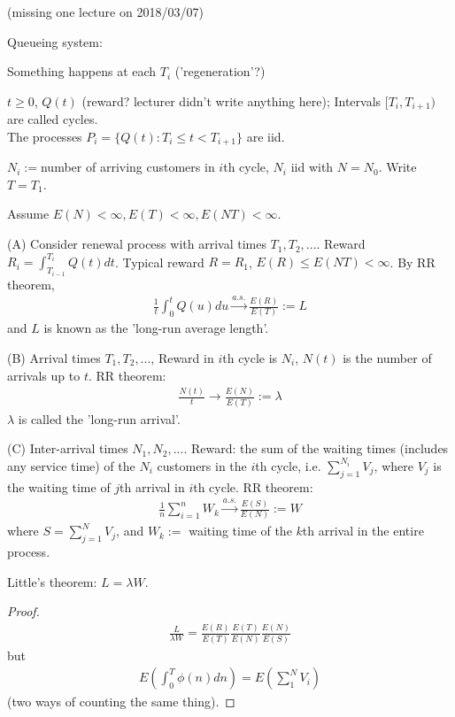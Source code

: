 \documentclass[a4paper]{article}
\begin{document}
(missing one lecture on 2018/03/07)

Queueing system:

Something happens at each $T_i$ ('regeneration'?)

$t \geq 0$, $Q(t)$ (reward? lecturer didn't write anything here); Intervals $[T_i,T_{i+1})$ are called cycles.\\
The processes $P_i = \{Q(t):T_i \leq t < T_{i+1}\}$ are iid.

$N_i:=$number of arriving customers in $i$th cycle, $N_i$ iid with $N=N_0$. Write $T=T_1$.

Assume $E(N) < \infty,E(T) < \infty, E(NT) < \infty$.

(A) Consider renewal process with arrival times $T_1,T_2,...$. Reward $R_i = \int_{T_{i-1}}^{T_i} Q(t) dt$. Typical reward $R=R_1$, $E(R) \leq E(NT) < \infty$. By RR theorem,
\begin{equation*}
\begin{aligned}
\frac{1}{t} \int_0^t Q(u) du \xrightarrow{a.s.} \frac{E(R)}{E(T)} := L
\end{aligned}
\end{equation*}
and $L$ is known as the 'long-run average length'.

(B) Arrival times $T_1,T_2,...$, Reward in $i$th cycle is $N_i$, $N(t)$ is the number of arrivals up to $t$. RR theorem:
\begin{equation*}
\begin{aligned}
\frac{N(t)}{t} \to \frac{E(N)}{E(T)} := \lambda
\end{aligned}
\end{equation*}
$\lambda$ is called the 'long-run arrival'.

(C) Inter-arrival times $N_1,N_2,...$. Reward: the sum of the waiting times (includes any service time) of the $N_i$ customers in the $i$th cycle, i.e. $\sum_{j=1}^{N_i} V_j$, where $V_j$ is the waiting time of $j$th arrival in $i$th cycle. RR theorem:
\begin{equation*}
\begin{aligned}
\frac{1}{n} \sum_{i=1}^{n} W_k \xrightarrow{a.s.} \frac{E(S)}{E(N)} := W
\end{aligned}
\end{equation*}
where $S = \sum_{j=1}^N V_j$, and $W_k:=$ waiting time of the $k$th arrival in the entire process.

Little's theorem: $L=\lambda W$.
\begin{proof}
\begin{equation*}
\begin{aligned}
\frac{L}{\lambda W} = \frac{E(R)}{E(T)}\frac{E(T)}{E(N)}\frac{E(N)}{E(S)}
\end{aligned}
\end{equation*}
but
\begin{equation*}
\begin{aligned}
E(\int_0^T \phi(n) dn) = E (\sum_1^N V_i)
\end{aligned}
\end{equation*}
(two ways of counting the same thing).
\end{proof}
\end{document}
